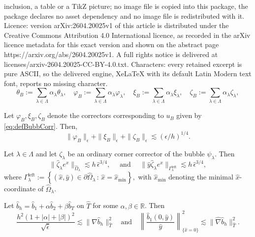 \documentclass[10pt,a4paper]{amsart}
\newcommand{\Gammaleft}{\ensuremath{\Gamma_\lambda^{\text{left}}}\xspace}
\newcommand{\hatN}{\ensuremath{\hat{\nabla}}}
\newcommand{\hatT}{\ensuremath{{\hat{T}}}}
\newcommand{\hatb}{\ensuremath{\hat{b}}}
\newcommand{\haty}{\ensuremath{{\hat{y}}}}
\newcommand{\rz}{\mathbb{R}}
\newcommand{\summLA}[1][{}]{\ensuremath{\sum_{\lambda\in\Lambda_{#1}}\alpha_\lambda}}
\begin{document}
inclusion, a table or a TikZ picture; no image file is copied into this package, the package declares no asset dependency and no image file is redistributed with it. Licence: version arXiv:2604.20025v1 of this article is distributed under the Creative Commons Attribution 4.0 International licence, as recorded in the arXiv licence metadata for this exact version and shown on the abstract page https://arxiv.org/abs/2604.20025v1. A full rights notice is delivered at licenses/arxiv-2604.20025-CC-BY-4.0.txt. Characters: every retained excerpt is pure ASCII, so the delivered engine, XeLaTeX with its default Latin Modern text font, reports no missing character.
\begin{equation}\label{eq:defBubbCorr}
    \theta_B := \summLA \theta_\lambda,
    \quad
    \varphi_B := \summLA \varphi_\lambda,
    \quad
    \xi_B := \summLA \xi_\lambda,
    \quad
    \zeta_B := \summLA \zeta_\lambda,
\end{equation}

\begin{lemma}
\label{Lemma:boundBubbleCorr}
Let $\varphi_B, \xi_B, \zeta_B$ denote the correctors corresponding to $u_B$ given by \eqref{eq:defBubbCorr}.
Then,
$$
\|\varphi_B\|_\epsilon  +  \|\xi_B\|_\epsilon + \|\zeta_B\|_\epsilon  \lesssim  (\epsilon/h)^{1/4}.
$$
\end{lemma}

\begin{lemma}\label{Temam:zetaBubble}
Let $\lambda \in \Lambda$ and let $\zeta
_\lambda$ be an ordinary corner corrector of the bubble $\psi_\lambda$. Then
$$
\|\hat{\zeta}_\lambda e^x\|_{\hat{\Omega}_\lambda} \lesssim h \,\hat{\epsilon}^{3/4},
\quad \text{ and }\quad
\|\hat{y}\hat{\zeta}_\lambda e^x\|_{\Gammaleft} \lesssim h \,\hat{\epsilon}^{3/4},
$$
where \(\Gammaleft := \left\{ (\hat{x}, \hat{y}) \in \partial \hat{\Omega}_\lambda \,:\, \hat{x} = \hat x_{\min} \right\},
\)
with $\hat x_{\min}$ denoting the minimal $\hat{x}$-coordinate of $\hat{\Omega}_\lambda$.
\end{lemma}

\begin{propo}\label{propo: bh_inf_bound}
  Let $\hatb_h= \hatb_1 + \alpha \hatb_2 + \beta \hatb_T$ on $\hatT$ for some $\alpha,\beta\in \rz$. Then
  \begin{equation*}
  \frac{h^2(1+|\alpha|+|\beta|)^2}{\sqrt{\hat{\epsilon}}}
  \lesssim \|\hatN \hatb_h \|_\hatT^2 
  \quad\text{and}\quad
      \left\| \frac{\hat{b}_1(0,\haty)}{\haty} \right\|_{\{\hat{x}=0\}}^2 \lesssim
      \|\hatN \hatb_h \|_\hatT^2.
  \end{equation*}
\end{propo}
\end{document}
